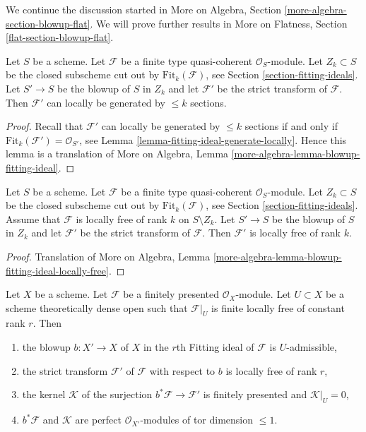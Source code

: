 \noindent
We continue the discussion started in
More on Algebra, Section \ref{more-algebra-section-blowup-flat}.
We will prove further results in More on Flatness, Section
\ref{flat-section-blowup-flat}.


\begin{lemma}
\label{lemma-strict-transform-blowup-fitting-ideal}
Let $S$ be a scheme. Let $\mathcal{F}$ be a finite type
quasi-coherent $\mathcal{O}_S$-module. Let $Z_k \subset S$ be the closed
subscheme cut out by $\text{Fit}_k(\mathcal{F})$, see
Section \ref{section-fitting-ideals}.
Let $S' \to S$ be the blowup of $S$ in $Z_k$ and let
$\mathcal{F}'$ be the strict transform of $\mathcal{F}$.
Then $\mathcal{F}'$ can locally be generated by $\leq k$
sections.
\end{lemma}

\begin{proof}
Recall that $\mathcal{F}'$ can locally be generated by $\leq k$
sections if and only if $\text{Fit}_k(\mathcal{F}') = \mathcal{O}_{S'}$, see
Lemma \ref{lemma-fitting-ideal-generate-locally}.
Hence this lemma is a translation of
More on Algebra, Lemma \ref{more-algebra-lemma-blowup-fitting-ideal}.
\end{proof}

\begin{lemma}
\label{lemma-strict-transform-blowup-fitting-ideal-locally-free}
Let $S$ be a scheme. Let $\mathcal{F}$ be a finite type
quasi-coherent $\mathcal{O}_S$-module. Let $Z_k \subset S$ be the closed
subscheme cut out by $\text{Fit}_k(\mathcal{F})$, see
Section \ref{section-fitting-ideals}.
Assume that $\mathcal{F}$ is locally free of rank $k$ on $S \setminus Z_k$.
Let $S' \to S$ be the blowup of $S$ in $Z_k$ and let
$\mathcal{F}'$ be the strict transform of $\mathcal{F}$.
Then $\mathcal{F}'$ is locally free of rank $k$.
\end{lemma}

\begin{proof}
Translation of More on Algebra, Lemma
\ref{more-algebra-lemma-blowup-fitting-ideal-locally-free}.
\end{proof}

\begin{lemma}
\label{lemma-blowup-fitting-ideal}
Let $X$ be a scheme. Let $\mathcal{F}$ be a finitely presented
$\mathcal{O}_X$-module. Let $U \subset X$ be a scheme theoretically
dense open such that $\mathcal{F}|_U$ is finite locally free of
constant rank $r$. Then
\begin{enumerate}
\item the blowup $b : X' \to X$ of $X$ in the $r$th Fitting
ideal of $\mathcal{F}$ is $U$-admissible,
\item the strict transform $\mathcal{F}'$ of $\mathcal{F}$
with respect to $b$ is locally free of rank $r$,
\item the kernel $\mathcal{K}$ of the surjection
$b^*\mathcal{F} \to \mathcal{F}'$ is
finitely presented and $\mathcal{K}|_U = 0$,
\item $b^*\mathcal{F}$ and $\mathcal{K}$ are perfect
$\mathcal{O}_{X'}$-modules of tor dimension $\leq 1$.
\end{enumerate}
\end{lemma}

